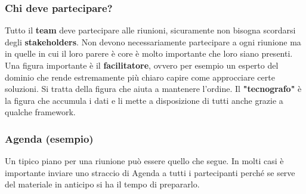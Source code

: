 \subsubsection{Chi deve partecipare?}
Tutto il \textbf{team} deve partecipare alle riunioni, sicuramente non bisogna scordarsi degli \textbf{stakeholders}. Non devono necessariamente partecipare a ogni riunione ma in quelle in cui il loro parere è core è molto importante che loro siano presenti. Una figura importante è il \textbf{facilitatore}, ovvero per esempio un esperto del dominio che rende estremamente più chiaro capire come approcciare certe soluzioni. Si tratta della figura che aiuta a mantenere l'ordine.\newline
Il \textbf{"tecnografo"} è la figura che accumula i dati e li mette a disposizione di tutti anche grazie a qualche framework.
\subsubsection{Agenda (esempio)}
Un tipico piano per una riunione può essere quello che segue. In molti casi è importante inviare uno straccio di Agenda a tutti i partecipanti perché se serve del materiale in anticipo si ha il tempo di prepararlo.

